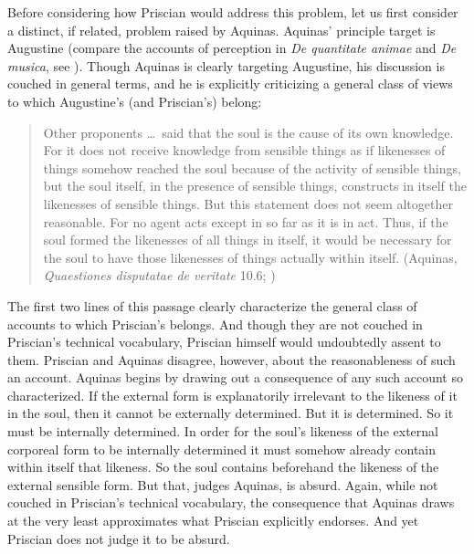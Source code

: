 \documentclass[12pt]{article}
\begin{document}
Before considering how Priscian would address this problem, let us first consider a distinct, if related, problem raised by Aquinas. Aquinas' principle target is Augustine (compare the accounts of perception in \emph{De quantitate animae} and \emph{De musica}, see \citealt[208--210, n.73]{Colleran:1949ys}). Though Aquinas is clearly targeting Augustine, his discussion is couched in general terms, and he is explicitly criticizing a general class of views to which Augustine's (and Priscian's) belong:
\begin{quote}
	Other proponents \ldots\ said that the soul is the cause of its own knowledge. For it does not receive knowledge from sensible things as if likenesses of things somehow reached the soul because of the activity of sensible things, but the soul itself, in the presence of sensible things, constructs in itself the likenesses of sensible things. But this statement does not seem altogether reasonable. For no agent acts except in so far as it is in act. Thus, if the soul formed the likenesses of all things in itself, it would be necessary for the soul to have those likenesses of things actually within itself. (Aquinas, \emph{Quaestiones disputatae de veritate} 10.6; \citealt[24]{James-V.-McGlynn:1953rz})
\end{quote}
The first two lines of this passage clearly characterize the general class of accounts to which Priscian's belongs. And though they are not couched in Priscian's technical vocabulary, Priscian himself would undoubtedly assent to them. Priscian and Aquinas disagree, however, about the reasonableness of such an account. Aquinas begins by drawing out a consequence of any such account so characterized. If the external form is explanatorily irrelevant to the likeness of it in the soul, then it cannot be externally determined. But it is determined. So it must be internally determined. In order for the soul's likeness of the external corporeal form to be internally determined it must somehow already contain within itself that likeness. So the soul contains beforehand the likeness of the external sensible form. But that, judges Aquinas, is absurd. Again, while not couched in Priscian's technical vocabulary, the consequence that Aquinas draws at the very least approximates what Priscian explicitly endorses. And yet Priscian does not judge it to be absurd.
\end{document}

